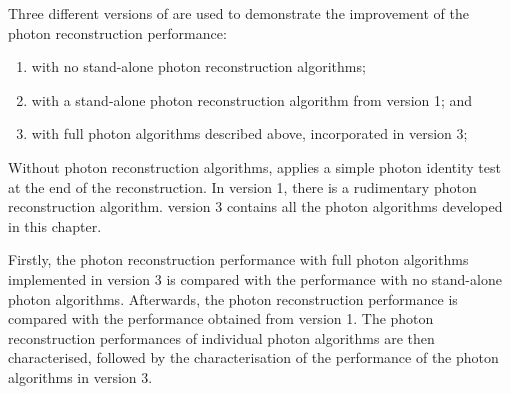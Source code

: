 

Three different versions of \pandora are used to demonstrate the improvement of  the photon reconstruction performance:
\begin{enumerate}
  \item with no stand-alone photon reconstruction algorithms;
  \item with a stand-alone photon reconstruction algorithm from \pandora version 1; and
  \item with full photon algorithms described above, incorporated in \pandora version 3;
\end{enumerate}

Without photon reconstruction algorithms, \pandora applies a simple photon identity test at the end of the reconstruction. In \pandora version 1, there is a rudimentary photon reconstruction algorithm. \pandora version 3 contains all the photon algorithms developed in this chapter.



Firstly, the photon reconstruction performance with full photon algorithms implemented in \pandora version 3 is compared with the performance with no  stand-alone photon algorithms. Afterwards, the photon reconstruction performance  is compared with the performance obtained from  \pandora version 1. The photon reconstruction performances of individual photon algorithms are then characterised, followed by the characterisation of the performance of the photon algorithms in \pandora version 3.

